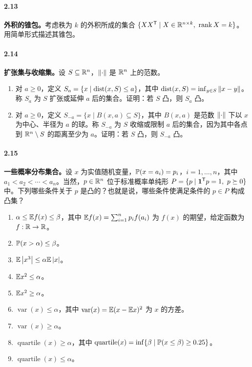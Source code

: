\paragraph{2.13}
\textbf{外积的锥包。}考虑秩为 $k$ 的外积所成的集合 $\{XX^{\mathsf T}\mid X\in\mathbb R^{n\times k},\ \operatorname{rank} X=k\}$。用简单形式描述其锥包。

\paragraph{2.14}
\textbf{扩张集与收缩集。}设 $S\subseteq\mathbb R^n$，$\left\lVert \cdot\right\rVert$ 是 $\mathbb R^n$ 上的范数。
\begin{enumerate}[label=(\alph*)]
\item 对 $a\ge0$，定义 $S_a=\{x\mid\operatorname{dist}(x,S)\le a\}$，其中 $\operatorname{dist}(x,S)=\inf_{y\in S}\left\lVert x-y\right\rVert$。称 $S_a$ 为 $S$ 扩张或延伸 $a$ 后的集合。证明：若 $S$ 凸，则 $S_a$ 凸。
\item 对 $a\ge0$，定义 $S_{-a}=\{x\mid B(x,a)\subseteq S\}$，其中 $B(x,a)$ 是范数 $\left\lVert \cdot\right\rVert$ 下以 $x$ 为中心、半径为 $a$ 的球。称 $S_{-a}$ 为 $S$ 收缩或限制 $a$ 后的集合，因为其中各点到 $\mathbb R^n\setminus S$ 的距离至少为 $a$。证明：若 $S$ 凸，则 $S_{-a}$ 凸。
\end{enumerate}

\paragraph{2.15}
\textbf{一些概率分布集合。}设 $x$ 为实值随机变量，$\mathbb P(x=a_i)=p_i$，$i=1,\ldots,n$，其中 $a_1<a_2<\cdots<a_n$。当然，$p\in\mathbb R^n$ 位于标准概率单纯形 $P=\{p\mid\mathbf 1^{\mathsf T}p=1,\ p\succeq0\}$ 中。下列哪些条件关于 $p$ 是凸的？也就是说，哪些条件使满足条件的 $p\in P$ 构成凸集？
\begin{enumerate}[label=(\alph*)]
\item $\alpha\le\mathbb E f(x)\le\beta$，其中 $\mathbb E f(x)=\sum_{i=1}^np_if(a_i)$ 为 $f(x)$ 的期望，给定函数为 $f:\mathbb R\to\mathbb R$。
\item $\mathbb P(x>\alpha)\le\beta$。
\item $\mathbb E\left\lvert x^3\right\rvert\le\alpha\mathbb E\left\lvert x\right\rvert$。
\item $\mathbb E x^2\le\alpha$。
\item $\mathbb E x^2\ge\alpha$。
\item $\operatorname{var}(x)\le\alpha$，其中 $\operatorname{var}(x)=\mathbb E(x-\mathbb E x)^2$ 为 $x$ 的方差。
\item $\operatorname{var}(x)\ge\alpha$。
\item $\operatorname{quartile}(x)\ge\alpha$，其中 $\operatorname{quartile}(x)=\inf\{\beta\mid\mathbb P(x\le\beta)\ge0.25\}$。
\item $\operatorname{quartile}(x)\le\alpha$。
\end{enumerate}

